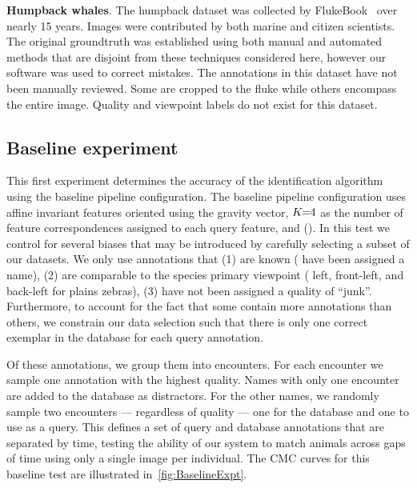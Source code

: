 \begin{itemln}
            \item \textbf{Humpback whales}.
            The humpback dataset was collected by FlukeBook~\cite{levenson_flukebook_2015} over nearly 15 years.
            Images were contributed by both marine and citizen scientists.
            The original groundtruth was established using both manual and automated methods that are disjoint
              from these techniques considered here, however our software was used to correct mistakes.
            The annotations in this dataset have not been manually reviewed.
            Some are cropped to the fluke while others encompass the entire image.
            Quality and viewpoint labels do not exist for this dataset.
        \end{itemln}

    \FloatBarrier{}
    \subsection{Baseline experiment}\label{sub:exptbase}

        This first experiment determines the accuracy of the identification algorithm using the baseline pipeline
        configuration. The baseline pipeline configuration uses affine invariant features oriented using the
        gravity vector, $K\mkern-6mu=\mkern-6mu4$ as the number of feature correspondences assigned to each query feature, and
        \nscoring{} (\nsum{}). In this test we control for several biases that may be introduced by carefully
        selecting a subset of our datasets. We only use annotations that (1) are known (\ie{} have been assigned a
        name), (2) are comparable to the species primary viewpoint (\eg{} left, front-left, and back-left for
        plains zebras), (3) have not been assigned a quality of ``junk''. Furthermore, to account for the fact that
        some \names{} contain more annotations than others, we constrain our data selection such that there is only
        one correct exemplar in the database for each query annotation.

        Of these annotations, we group them into encounters. For each encounter we sample one annotation with the
        highest quality. Names with only one encounter are added to the database as distractors. For the other
        names, we randomly sample two encounters --- regardless of quality --- one for the database and one to use
        as a query. This defines a set of query and database annotations that are separated by time, testing the
        ability of our system to match animals across gaps of time using only a single image per individual. The
        CMC curves for this baseline test are illustrated in~\cref{fig:BaselineExpt}.

